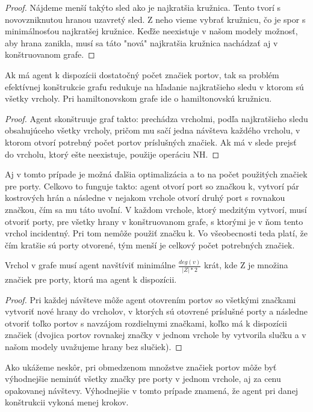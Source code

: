 \begin{proof}
Nájdeme menší takýto sled ako je najkratšia kružnica. Tento tvorí s
novovzniknutou hranou uzavretý sled. Z neho vieme vybrať
kružnicu, čo je spor s minimálnosťou najkratšej kružnice. Keďže neexistuje v
našom modely možnosť, aby hrana zanikla, musí sa táto "nová" najkratšia
kružnica nachádzať aj v konštruovanom grafe.
\end{proof}

\begin{lem}
Ak má agent k dispozícii dostatočný počet značiek portov, 
tak sa problém efektívnej konštrukcie grafu
redukuje na hľadanie najkratšieho sledu v ktorom sú všetky vrcholy. Pri
hamiltonovskom grafe ide o hamiltonovskú kružnicu.
\end{lem}
\begin{proof}
Agent skonštruuje graf takto: prechádza vrcholmi, podľa najkratšieho sledu
obsahujúceho všetky vrcholy, pričom mu sačí jedna návšteva každého vrcholu,
 v ktorom
otvorí potrebný počet portov príslušných značiek. Ak má v slede prejsť do
vrcholu, ktorý ešte neexistuje, použije operáciu NH.
\end{proof}

\begin{pozn}
Aj v tomto prípade je možná ďalšia optimalizácia a to na počet použitých
značiek pre porty. Celkovo to funguje takto: agent otvorí port so značkou k, vytvorí pár
kostrových hrán a následne v nejakom vrchole otvorí druhý port s rovnakou
značkou, čím sa mu táto uvoľní. V každom vrchole, ktorý medzitým vytvorí,
musí otvoriť porty, pre všetky hrany v konštruovanom grafe, s ktorými je v
ňom tento vrchol incidentný. Pri tom nemôže použiť značku k. Vo všeobecnosti
teda platí, že čím kratšie sú porty otvorené, tým menší je celkový počet
potrebných značiek.
\end{pozn}

\begin{lem}
Vrchol v grafe musí agent navštíviť minimálne $\frac{deg(v)}{|Z| * 2} $ krát,
kde Z je množina značiek pre porty, ktorú ma agent k dispozícii.
\end{lem}
\begin{proof}
Pri každej návšteve môže agent otovrením portov so všetkými značkami 
vytvoriť nové hrany do vrcholov, v ktorých sú otovrené príslušné porty 
a následne otvoriť toľko
portov s navzájom rozdielnymi značkami, koľko má k dispozícii značiek
(dvojica portov rovnakej značky v jednom vrchole by vytvorila slučku a v
našom modely uvažujeme hrany bez slučiek).
\end{proof}
\begin{pozn}
Ako ukážeme neskôr, pri obmedzenom množstve značiek portov môže byť
výhodnejšie neminúť všetky značky pre porty v jednom vrchole, aj za cenu
opakovanej návštevy. Výhodnejšie v tomto prípade znamená, že agent pri danej
konštrukcii vykoná menej krokov.
\end{pozn}


